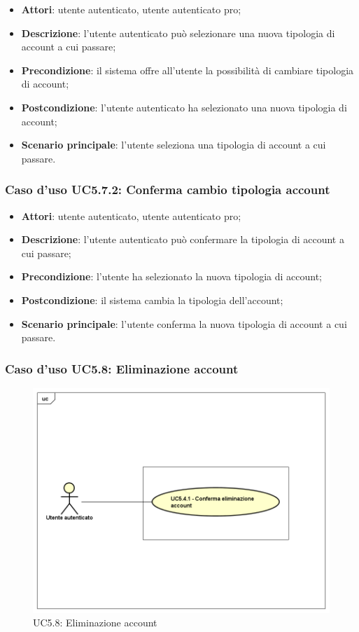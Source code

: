 \begin{itemize}
	\item \textbf{Attori}: utente autenticato, utente autenticato pro;
	\item \textbf{Descrizione}: l'utente autenticato può selezionare una nuova tipologia di account a cui passare;
	\item \textbf{Precondizione}: il sistema offre all'utente la possibilità di cambiare tipologia di account;
	\item \textbf{Postcondizione}: l'utente autenticato ha selezionato  una nuova tipologia di account;
	\item \textbf{Scenario principale}: l'utente seleziona una tipologia di account a cui passare.
\end{itemize}

\subsubsection{Caso d'uso UC5.7.2: Conferma cambio tipologia account}

\begin{itemize}
	\item \textbf{Attori}: utente autenticato, utente autenticato pro;
	\item \textbf{Descrizione}: l'utente autenticato può confermare la tipologia di account a cui passare;
	\item \textbf{Precondizione}: l'utente ha selezionato la nuova tipologia di account;
	\item \textbf{Postcondizione}: il sistema cambia la tipologia dell'account;
	\item \textbf{Scenario principale}: l'utente conferma la nuova tipologia di account a cui passare.
\end{itemize}

\subsubsection{Caso d'uso UC5.8: Eliminazione account}
\label{UC5.8}
\begin{figure}[h]
	\centering
	\includegraphics[scale=0.5,keepaspectratio]{UML/UC5_8.png}
	\caption{UC5.8: Eliminazione account}
\end{figure}

